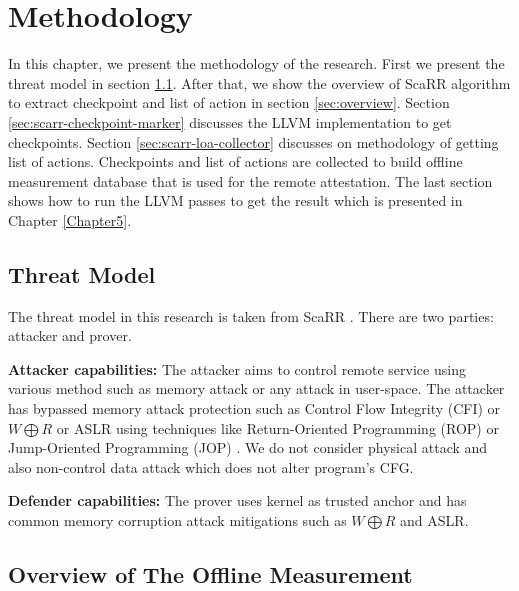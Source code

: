 
\chapter{Methodology} %

\label{Chapter4} %

In this chapter, we present the methodology of the research. First we present 
the threat model in section \ref{sec:threat-model}.  After that, we show the overview of 
ScaRR algorithm to extract checkpoint and list of action in section \ref{sec:overview}. 
Section \ref{sec:scarr-checkpoint-marker} discusses the LLVM implementation to get checkpoints. 
Section \ref{sec:scarr-loa-collector} discusses on methodology of getting list of actions.  
Checkpoints and list of actions are collected to build offline measurement 
database that is used for the remote attestation. The last section shows how to run the LLVM passes to 
get the result which is presented in Chapter \ref{Chapter5}.

\section{Threat Model}
\label{sec:threat-model}

The threat model in this research is taken from ScaRR \cite{toffaliniScaRRScalableRuntime2019}. There are two parties: attacker and prover. 

\vspace{0.5cm}
\noindent \textbf{Attacker capabilities:}
The attacker aims to control remote service using various method such as memory attack or any attack in user-space. 
The attacker has bypassed memory attack protection such as Control Flow Integrity (CFI) or \( W \bigoplus R \) or ASLR using techniques
like Return-Oriented Programming (ROP)\cite{roemerReturnorientedProgrammingSystems2012} or Jump-Oriented Programming (JOP) 
\cite{bletschJumpOrientedProgrammingNew2011}. We do not consider physical attack and also non-control data attack which does not alter program's CFG.

\vspace{0.5cm}
\noindent \textbf{Defender capabilities:}
The prover uses kernel as trusted anchor and has common memory corruption attack mitigations such as \( W \bigoplus R \) and ASLR.  

\section{Overview of The Offline Measurement}\
\label{sec:overview}

